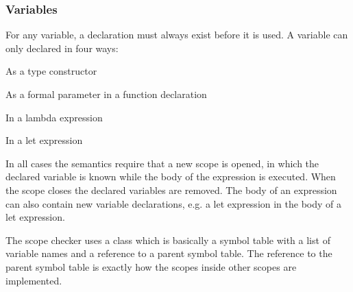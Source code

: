 

\subsubsection{Variables}
For any variable, a declaration must always exist before it is used. A variable
can only declared in four ways:

\begin{nlist}
  \item As a type constructor
  \item As a formal parameter in a function declaration
  \item In a lambda expression
  \item In a let expression
\end{nlist}

In all cases the \productname{} semantics require that a new scope is opened, in
which the declared variable is known while the body of the expression is
executed. When the scope closes the declared variables are removed. The body of
an expression can also contain new variable declarations, e.g. a let
expression in the body of a let expression. 

The scope checker uses a  class which is basically a
symbol table with a list of variable names and a reference to a parent symbol
table.  The reference to the parent symbol table is exactly how the scopes
inside other scopes are implemented. 


